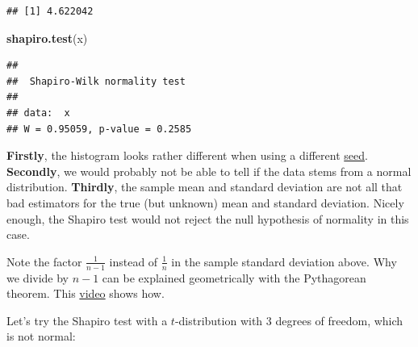 \documentclass[
]{book}
\newenvironment{Shaded}{\begin{snugshade}}{\end{snugshade}}
\newcommand{\FunctionTok}[1]{\textcolor[rgb]{0.13,0.29,0.53}{\textbf{#1}}}
\newcommand{\NormalTok}[1]{#1}
\begin{document}
\begin{verbatim}
## [1] 4.622042
\end{verbatim}

\begin{Shaded}
\begin{Highlighting}[]
\FunctionTok{shapiro.test}\NormalTok{(x)}
\end{Highlighting}
\end{Shaded}

\begin{verbatim}
## 
##  Shapiro-Wilk normality test
## 
## data:  x
## W = 0.95059, p-value = 0.2585
\end{verbatim}

\textbf{Firstly}, the histogram looks rather different when using a different \href{https://r-coder.com/set-seed-r/}{seed}.
\textbf{Secondly}, we would probably
not be able to tell if the data stems from a normal distribution.
\textbf{Thirdly}, the sample mean and standard deviation
are not all that bad estimators for the true (but unknown) mean and standard deviation. Nicely enough,
the Shapiro test would not reject the null hypothesis of normality in this case.

Note the factor \(\frac{1}{n-1}\) instead of \(\frac{1}{n}\) in the sample standard deviation above.
Why we divide by \(n-1\) can be explained geometrically with the Pythagorean theorem.
This \href{https://www.youtube.com/watch?v=8e9aDMXRRlc}{video} shows how.

Let's try the Shapiro test with a \(t\)-distribution with 3 degrees of freedom, which is not normal:
\end{document}
